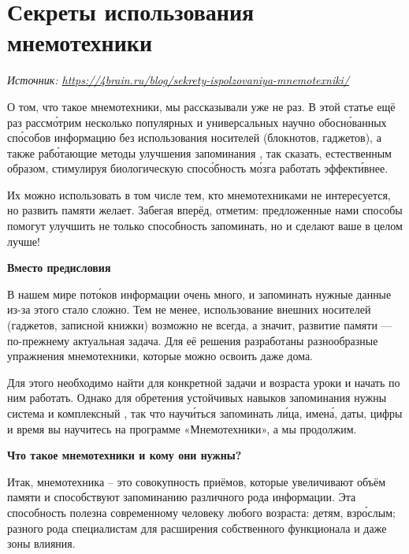 \section{Секреты использования мнемотехники}

\textit{Источник: \url{https://4brain.ru/blog/sekrety-ispolzovaniya-mnemotexniki/}}

О том, что такое мнемотехники, мы рассказывали уже не раз. В этой статье ещё раз рассм\'{о}трим несколько популярных и универсальных научно обосн\'{о}ванных сп\'{о}собов  информацию без использования  носителей (блокнотов, гаджетов), а также раб\'{о}тающие методы улучшения запоминания , так сказать, естественным образом, стимулируя биологическую спос\'{о}бность м\'{о}зга работать эффект\'{и}внее.

Их можно использовать в том числе тем, кто  мнемотехниками не интересуется, но развить  памяти желает. Забегая вперёд, отметим: предложенные нами способы помогут улучшить не только способность запоминать, но и сделают ваше  в целом лучше!

\textbf{Вместо предисловия}

В нашем мире пот\'{о}ков информации очень много,  и запоминать нужные данные из-за этого стало сложно. Тем не менее, использование внешних носителей (гаджетов, записной книжки) возможно не всегда, а значит, развитие памяти --- по-прежнему актуальная задача. Для её решения разработаны разнообразные упражнения мнемотехники, которые можно освоить даже дома.

Для этого необходимо найти  для конкретной задачи и возраста уроки и начать по ним работать. Однако для обретения устойчивых навыков запоминания нужны система и комплексный , так что науч\'{и}ться запоминать л\'{и}ца, имен\'{а}, даты, цифры и время вы научитесь на программе «Мнемотехники», а мы продолжим.

\textbf{Что такое мнемотехники и кому они нужны?}

Итак, мнемотехника – это совокупность приёмов, которые увеличивают объём памяти и способствуют запоминанию различного рода информации. Эта способность полезна современному человеку любого возраста: детям, взр\'{о}слым; разного рода специалистам для расширения собственного функционала и даже зоны влияния.

